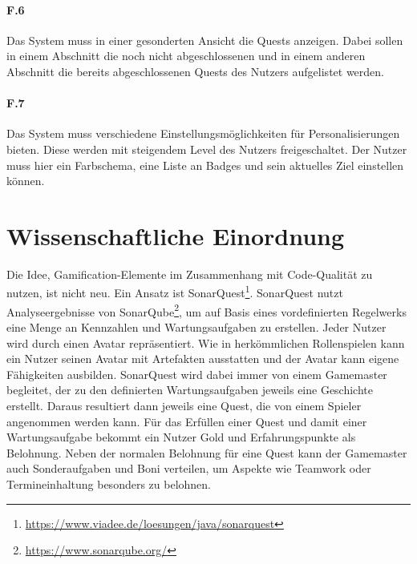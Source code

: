 \documentclass[
	oneside,  %
	ngerman, 
	final, 
	11pt, 
	a4paper, 
	1.1headlines, 
	headinclude=false, 
	footinclude=false, 
	mpinclude=false, 
	pagesize, 
	onecolumn, 
	titlepage, 
	parskip=half, 
	headsepline, 
	chapterprefix=false, 
	version=first, 
	listof=totoc, 
	bibliography=totoc, 
	toc=graduated, 
	fleqn
]{scrbook}
\begin{document}
\paragraph{F.6}
Das System muss in einer gesonderten Ansicht die Quests anzeigen.
Dabei sollen in einem Abschnitt die noch nicht abgeschlossenen und in einem anderen Abschnitt die bereits abgeschlossenen Quests des Nutzers aufgelistet werden.

\paragraph{F.7}
Das System muss verschiedene Einstellungsmöglichkeiten für Personalisierungen bieten.
Diese werden mit steigendem Level des Nutzers freigeschaltet.
Der Nutzer muss hier ein Farbschema, eine Liste an Badges und sein aktuelles Ziel einstellen können.

\section{Wissenschaftliche Einordnung}
\label{Wissenschaftliche_Einordnung}
Die Idee, Gamification-Elemente im Zusammenhang mit Code-Qualität zu nutzen, ist nicht neu.
Ein Ansatz ist SonarQuest\footnote{\url{https://www.viadee.de/loesungen/java/sonarquest}}.
SonarQuest nutzt Analyseergebnisse von SonarQube\footnote{\url{https://www.sonarqube.org/}}, um auf Basis eines vordefinierten Regelwerks eine Menge an Kennzahlen und Wartungsaufgaben zu erstellen.
Jeder Nutzer wird durch einen Avatar repräsentiert.
Wie in herkömmlichen Rollenspielen kann ein Nutzer seinen Avatar mit Artefakten ausstatten und der Avatar kann eigene Fähigkeiten ausbilden.
SonarQuest wird dabei immer von einem Gamemaster begleitet, der zu den definierten Wartungsaufgaben jeweils eine Geschichte erstellt.
Daraus resultiert dann jeweils eine Quest, die von einem Spieler angenommen werden kann.
Für das Erfüllen einer Quest und damit einer Wartungsaufgabe bekommt ein Nutzer Gold und Erfahrungspunkte als Belohnung. 
Neben der normalen Belohnung für eine Quest kann der Gamemaster auch Sonderaufgaben und Boni verteilen, um Aspekte wie Teamwork oder Termineinhaltung besonders zu belohnen.\cite{SonarQuest}
\end{document}
